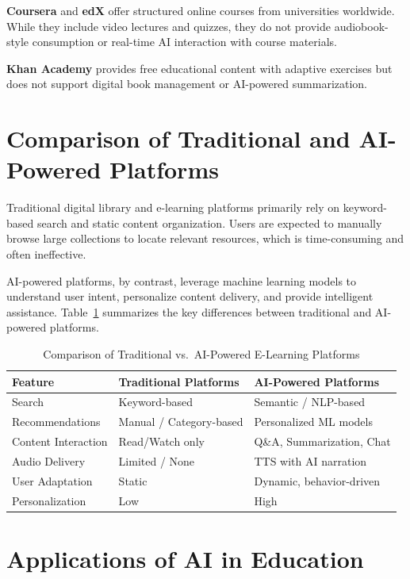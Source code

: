 \textbf{Coursera} and \textbf{edX} offer structured online courses from
universities worldwide. While they include video lectures and quizzes, they
do not provide audiobook-style consumption or real-time AI interaction
with course materials.

\textbf{Khan Academy} provides free educational content with adaptive
exercises but does not support digital book management or AI-powered
summarization.

\section{Comparison of Traditional and AI-Powered Platforms}
\label{sec:comparison}

Traditional digital library and e-learning platforms primarily rely on
keyword-based search and static content organization. Users are expected to
manually browse large collections to locate relevant resources, which is
time-consuming and often ineffective.

AI-powered platforms, by contrast, leverage machine learning models to
understand user intent, personalize content delivery, and provide intelligent
assistance. Table~\ref{tab:comparison} summarizes the key differences between
traditional and AI-powered platforms.

\begin{table}[H]
\centering
\caption{Comparison of Traditional vs.\ AI-Powered E-Learning Platforms}
\label{tab:comparison}
\begin{tabularx}{\textwidth}{|l|X|X|}
\hline
\textbf{Feature} & \textbf{Traditional Platforms} & \textbf{AI-Powered Platforms} \\
\hline
Search & Keyword-based & Semantic / NLP-based \\
\hline
Recommendations & Manual / Category-based & Personalized ML models \\
\hline
Content Interaction & Read/Watch only & Q\&A, Summarization, Chat \\
\hline
Audio Delivery & Limited / None & TTS with AI narration \\
\hline
User Adaptation & Static & Dynamic, behavior-driven \\
\hline
Personalization & Low & High \\
\hline
\end{tabularx}
\end{table}

\section{Applications of AI in Education}
\label{sec:aiinedu}

